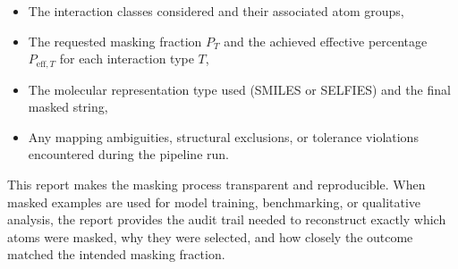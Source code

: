\documentclass[a4paper,12pt]{article}
\begin{document}
\begin{itemize}
    \item The interaction classes considered and their associated atom groups,
    \item The requested masking fraction $P_T$ and the achieved effective
    percentage $P_{\text{eff},T}$ for each interaction type $T$,
    \item The molecular representation type used (SMILES or SELFIES) and the
    final masked string,
    \item Any mapping ambiguities, structural exclusions, or tolerance
    violations encountered during the pipeline run.
\end{itemize}

\noindent
This report makes the masking process transparent and reproducible. When masked examples are used for model training, benchmarking, or qualitative analysis, the report provides the audit trail needed to reconstruct exactly which atoms were masked, why they were selected, and how
closely the outcome matched the intended masking fraction.


\pagebreak
\end{document}
